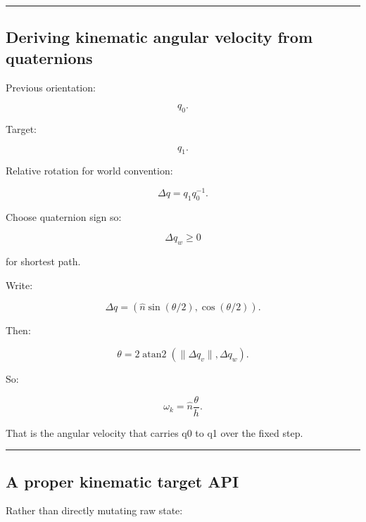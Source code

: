 \begin{center}\rule{0.5\linewidth}{0.5pt}\end{center}

\subsection{Deriving kinematic angular velocity from quaternions}\label{06-engine-ii-ch037-deriving-kinematic-angular-velocity-from-quaternions}

\hypertarget{06-engine-ii-ch037-deriving-kinematic-angular-velocity-from-quaternions}{}

Previous orientation:

\[
q_0.
\]

Target:

\[
q_1.
\]

Relative rotation for world convention:

\[
\Delta q
=
q_1q_0^{-1}.
\]

Choose quaternion sign so:

\[
\Delta q_w\ge0
\]

for shortest path.

Write:

\[
\Delta q
=
(
\hat n\sin(\theta/2),
\cos(\theta/2)
).
\]

Then:

\[
\theta
=
2\operatorname{atan2}
(
\|\Delta q_v\|,
\Delta q_w
).
\]

So:

\[
\boxed{
\omega_k
=
\hat n
\frac{\theta}{h}.
}
\]

That is the angular velocity that carries q0 to q1 over the fixed step.

\begin{center}\rule{0.5\linewidth}{0.5pt}\end{center}

\subsection{A proper kinematic target API}\label{06-engine-ii-ch037-a-proper-kinematic-target-api}

\hypertarget{06-engine-ii-ch037-a-proper-kinematic-target-api}{}

Rather than directly mutating raw state:

